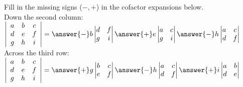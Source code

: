 \documentclass{ximera}
\begin{document}
    	  	   	  	 \begin{question} Fill in the missing signs ($-,+$) in the cofactor expansions below.\\
    	  	   	  	 
    	  	   	  	 	Down the second column:
    	  	   	  	 	$\left|\begin{array}{ccc} a&b &c \\ d &e &f \\ g&h& i\end{array}\right| =
    	  	   	  	 	\answer{-}b\left| \begin{matrix} d&f\\ g&i \end{matrix}\right|
    	  	   	  	 	\answer{+} e\left| \begin{matrix} a&c\\ g&i \end{matrix}\right|
    	  	   	  	 	\answer{-}h\left| \begin{matrix} a&c\\ d&f \end{matrix}\right|$\\
    	  	   	  	 	
    	  	   	  	 	Across the third row:
    	  	   	  	 	$\left|\begin{array}{ccc} a&b &c \\ d &e &f \\ g&h& i\end{array}\right| =
    	  	   	  	 	\answer{+}g\left| \begin{matrix} b&c\\ e&f \end{matrix}\right|
    	  	   	  	 	\answer{-} h\left| \begin{matrix} a&c\\ d&f \end{matrix}\right|
    	  	   	  	 	\answer{+}i\left| \begin{matrix} a&b\\ d&e \end{matrix}\right|$
    	  	   	  	 	
    	  	   	  	 	
    	  	   	  	 \end{question}	
  
\end{document}
